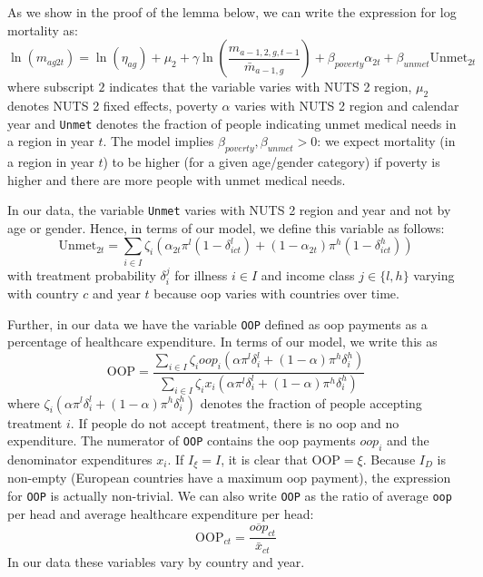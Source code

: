 \documentclass[a4paper,12pt]{article}
\begin{document}
As we show in the proof of the lemma below, we can write the expression for log mortality as:
\begin{equation}
\label{eq:health2}
\ln(m_{ag2t}) =\ln ( \eta_{ag}) + \mu_2 + \gamma \ln \left( \frac{m_{a-1,2,g,t-1}}{\bar m_{a-1,g}}\right) + \beta_{poverty}\alpha_{2t} + \beta_{unmet}\text{Unmet}_{2t}
\end{equation}
where subscript \(2\) indicates that the variable varies with NUTS 2 region, \(\mu_2\) denotes NUTS 2 fixed effects, poverty \(\alpha\) varies with NUTS 2 region and calendar year and \texttt{Unmet} denotes the fraction of people indicating unmet medical needs in a region in year \(t\). The model implies \(\beta_{poverty},\beta_{unmet}>0\): we expect mortality (in a region in year \(t\)) to be higher (for a given age/gender category) if poverty is higher and there are more people with unmet medical needs.

In our data, the variable \texttt{Unmet} varies with NUTS 2 region and year and not by age or gender. Hence, in terms of our model, we define this variable as follows:
\begin{equation}
\label{eq:Unmet}
\text{Unmet}_{2t} = \sum_{i \in I} \zeta_i (\alpha_{2t} \pi^l (1-\delta^l_{ict}) + (1-\alpha_{2t}) \pi^h (1-\delta^h_{ict}))
\end{equation}
with treatment probability \(\delta^j_i\) for illness \(i \in I\) and income class \(j \in \{l,h\}\) varying with country \(c\) and year \(t\) because oop varies with countries over time.

Further, in our data we have the variable \texttt{OOP}  defined as oop payments as a percentage of healthcare expenditure. In terms of our model, we write this as
\begin{equation}
\label{eq:OOP}
\text{OOP} = \frac{\sum_{i \in I} \zeta_i oop_i (\alpha \pi^l \delta^l_i + (1-\alpha) \pi^h \delta^h_i)}{\sum_{i \in I} \zeta_i x_i (\alpha \pi^l \delta_i^l + (1-\alpha) \pi^h \delta_i^h) }
\end{equation}
where \(\zeta_i (\alpha \pi^l \delta^l_i + (1-\alpha) \pi^h \delta^h_i)\) denotes the fraction of people accepting treatment \(i\). If people do not accept treatment, there is no oop and no expenditure. The numerator of \texttt{OOP} contains the oop payments \(oop_{i}\) and the denominator expenditures \(x_i\). If \(I_{\xi} = I\), it is clear that \(\text{OOP} = \xi\). Because \(I_D\) is non-empty (European countries have a maximum oop payment), the expression for \texttt{OOP} is actually non-trivial. We can also write \texttt{OOP} as the ratio of average \texttt{oop} per head and average healthcare expenditure per head:
\begin{equation}
\label{eq:OOP2}
\text{OOP}_{ct} = \frac{\overline{oop}_{ct}}{\bar{x}_{ct}}
\end{equation}
In our data these variables vary by country and year.
\end{document}
